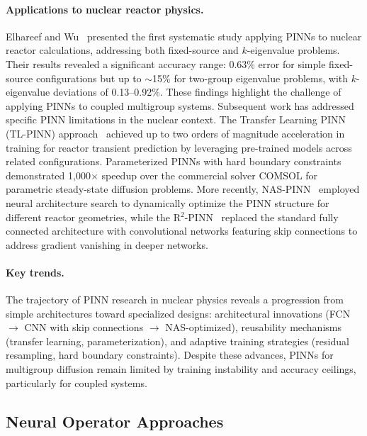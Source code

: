 \paragraph{Applications to nuclear reactor physics.}
Elhareef and Wu~\cite{elhareef2022pinn} presented the first systematic study applying PINNs to nuclear reactor calculations, addressing both fixed-source and $k$-eigenvalue problems.
Their results revealed a significant accuracy range: 0.63\% error for simple fixed-source configurations but up to $\sim$15\% for two-group eigenvalue problems, with $k$-eigenvalue deviations of 0.13--0.92\%.
These findings highlight the challenge of applying PINNs to coupled multigroup systems.
Subsequent work has addressed specific PINN limitations in the nuclear context.
The Transfer Learning PINN (TL-PINN) approach~\cite{tlpinn2023} achieved up to two orders of magnitude acceleration in training for reactor transient prediction by leveraging pre-trained models across related configurations.
Parameterized PINNs with hard boundary constraints~\cite{parampinn2024} demonstrated 1{,}000$\times$ speedup over the commercial solver COMSOL for parametric steady-state diffusion problems.
More recently, NAS-PINN~\cite{naspinn2025} employed neural architecture search to dynamically optimize the PINN structure for different reactor geometries, while the R$^2$-PINN~\cite{r2pinn2025} replaced the standard fully connected architecture with convolutional networks featuring skip connections to address gradient vanishing in deeper networks.

\paragraph{Key trends.}
The trajectory of PINN research in nuclear physics reveals a progression from simple architectures toward specialized designs: architectural innovations (FCN $\to$ CNN with skip connections $\to$ NAS-optimized), reusability mechanisms (transfer learning, parameterization), and adaptive training strategies (residual resampling, hard boundary constraints).
Despite these advances, PINNs for multigroup diffusion remain limited by training instability and accuracy ceilings, particularly for coupled systems.

\subsection{Neural Operator Approaches}
\label{sec:rw_neuralop}

